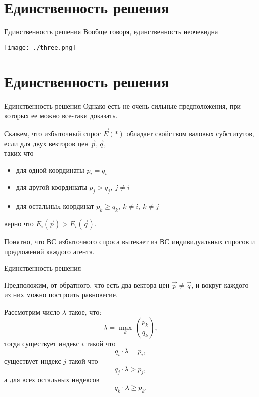 \documentclass{beamer}
\begin{document}
\section{Единственность решения}

\begin{frame}{Единственность решения}
Вообще говоря, единственность неочевидна
\begin{center}
     \texttt{[image: ./three.png]}
     \end{center}
\end{frame}

\section{Единственность решения}

\begin{frame}{Единственность решения}
Однако есть не очень сильные предположения, при которых ее можно все-таки доказать.

Скажем, что избыточный спрос $\vec E(*)$ обладает свойством \alert{валовых субститутов}, если для двух векторов цен $\vec p, \vec q,$ \\таких что 
\begin{itemize}
  \item для одной координаты $p_i = q_i$
  \item для другой координаты $p_j > q_j, \ j \neq i$
  \item для остальныx координат $p_k \geqslant q_k, \ k \neq i, \ k \neq j$
\end{itemize}
верно что $E_i(\vec p) > E_i(\vec q)$. 

Понятно, что ВС избыточного спроса вытекает из ВС индивидуальных спросов и предложений каждого агента.

\end{frame}

\begin{frame}{Единственность решения}

Предположим, от обратного, что есть два вектора цен $\vec p \neq \vec q$, и вокруг каждого из них можно построить равновесие.

Рассмотрим число $\lambda$ такое, что:
$$ \lambda = \max_k\ (\frac{p_k}{q_k}),$$
\pause тогда существует индекс $i$ такой что
$$ q_i \cdot \lambda = p_i,$$
\pause существует индекс $j$ такой что
$$ q_j \cdot \lambda > p_j,$$
\pause а для всех остальных индексов
$$ q_k \cdot \lambda \geqslant p_k.$$
\end{frame}
\end{document}
